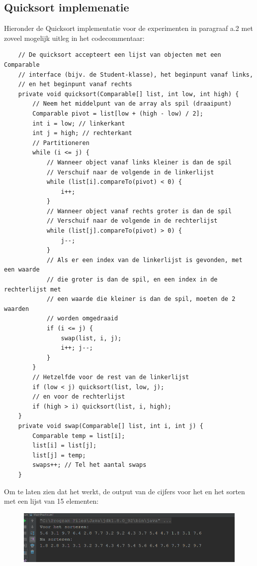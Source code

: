 \documentclass[12pt,notitlepage]{article}
\begin{document}
\subsection{Quicksort implemenatie}
Hieronder de Quicksort implementatie voor de experimenten in paragraaf a.2 met zoveel mogelijk uitleg in het codecommentaar:
\begin{lstlisting}
    // De quicksort accepteert een lijst van objecten met een Comparable
    // interface (bijv. de Student-klasse), het beginpunt vanaf links,
    // en het beginpunt vanaf rechts 
    private void quicksort(Comparable[] list, int low, int high) {
        // Neem het middelpunt van de array als spil (draaipunt)
        Comparable pivot = list[low + (high - low) / 2];
        int i = low; // linkerkant
        int j = high; // rechterkant
        // Partitioneren
        while (i <= j) {
            // Wanneer object vanaf links kleiner is dan de spil
            // Verschuif naar de volgende in de linkerlijst
            while (list[i].compareTo(pivot) < 0) {
                i++;
            }
            // Wanneer object vanaf rechts groter is dan de spil
            // Verschuif naar de volgende in de rechterlijst
            while (list[j].compareTo(pivot) > 0) {
                j--;
            }
            // Als er een index van de linkerlijst is gevonden, met een waarde
            // die groter is dan de spil, en een index in de rechterlijst met
            // een waarde die kleiner is dan de spil, moeten de 2 waarden
            // worden omgedraaid
            if (i <= j) {
                swap(list, i, j);
                i++; j--;
            }
        }
        // Hetzelfde voor de rest van de linkerlijst
        if (low < j) quicksort(list, low, j);
        // en voor de rechterlijst
        if (high > i) quicksort(list, i, high);
    }
    private void swap(Comparable[] list, int i, int j) {
        Comparable temp = list[i];
        list[i] = list[j];
        list[j] = temp;
        swaps++; // Tel het aantal swaps
    }
\end{lstlisting}
\clearpage
Om te laten zien dat het werkt, de output van de cijfers voor het en het sorten met een lijst van 15 elementen:

\begin{figure}[h!]
\centering
\includegraphics[scale=0.8]{quicksort_test.png}
\end{figure}
\end{document}
